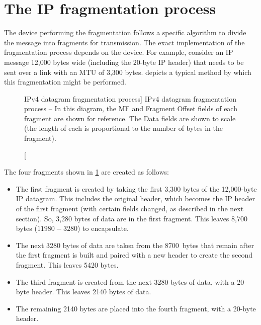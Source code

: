 \section{The IP fragmentation process}
\label{sec:ip-fragmentation-process}

The device performing the fragmentation follows a specific algorithm to divide the message into fragments for transmission.
The exact implementation of the
fragmentation process depends on the device. For example, consider an IP
message 12,000 bytes wide (including the 20-byte IP header) that needs
to be sent over a link with an MTU of 3,300 bytes.
 depicts a typical method by which this fragmentation might be performed.


\begin{figure}
   \centering
   \caption
      [IPv4 datagram fragmentation process]
      {IPv4 datagram fragmentation process -- In this diagram, the MF and Fragment Offset fields of each fragment are shown for reference.
      The Data fields are shown to scale (the length of each is proportional to the number of bytes in the fragment).}
   \label{fig:ipv4-datagram-fragmentation-process}
\end{figure}


The four fragments shown in \cref{fig:ipv4-datagram-fragmentation-process} are created as follows:

\begin{itemize}
   \item
      The first fragment is created by taking the first 3,300 bytes of the 12,000-byte IP datagram.
      This includes the original header, which becomes the IP header of the first fragment (with certain fields changed, as described in the next section).
      So, 3,280 bytes of data are in the first fragment.
      This leaves 8,700 bytes ($11980-3280$) to encapsulate.
   \item
      The next 3280 bytes of data are taken from the 8700~bytes that remain after
      the first fragment is built and paired with a new header to create the second fragment.
      This leaves 5420 bytes.
   \item
      The third fragment is created from the next 3280 bytes of data, with a 20-byte header. This leaves 2140 bytes of data.
   \item
      The remaining 2140 bytes are placed into the fourth fragment, with a 20-byte header.
\end{itemize}

